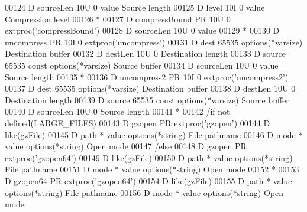 \begin{DoxyCode}
00124      D  sourceLen                    10U 0 value                                Source length
00125      D  level                        10I 0 value                                Compression level
00126       *
00127      D compressBound   PR            10U 0 extproc('compressBound')
00128      D  sourceLen                    10U 0 value
00129       *
00130      D uncompress      PR            10I 0 extproc('uncompress')
00131      D  dest                      65535    options(*varsize)                    Destination buffer
00132      D  destLen                      10U 0                                      Destination length
00133      D  source                    65535    const options(*varsize)              Source buffer
00134      D  sourceLen                    10U 0 value                                Source length
00135       *
00136      D uncompress2     PR            10I 0 extproc('uncompress2')
00137      D  dest                      65535    options(*varsize)                    Destination buffer
00138      D  destLen                      10U 0                                      Destination length
00139      D  source                    65535    const options(*varsize)              Source buffer
00140      D  sourceLen                    10U 0                                      Source length
00141       *
00142       /if not defined(LARGE\_FILES)
00143      D gzopen          PR                  extproc('gzopen')
00144      D                                     like(\hyperlink{structgz_file__s}{gzFile})
00145      D  path                           *   value options(*\textcolor{keywordtype}{string})               File pathname
00146      D  mode                           *   value options(*\textcolor{keywordtype}{string})               Open mode
00147       /else
00148      D gzopen          PR                  extproc('gzopen64')
00149      D                                     like(\hyperlink{structgz_file__s}{gzFile})
00150      D  path                           *   value options(*\textcolor{keywordtype}{string})               File pathname
00151      D  mode                           *   value options(*\textcolor{keywordtype}{string})               Open mode
00152       *
00153      D gzopen64        PR                  extproc('gzopen64')
00154      D                                     like(\hyperlink{structgz_file__s}{gzFile})
00155      D  path                           *   value options(*\textcolor{keywordtype}{string})               File pathname
00156      D  mode                           *   value options(*\textcolor{keywordtype}{string})               Open mode

\end{DoxyCode}
